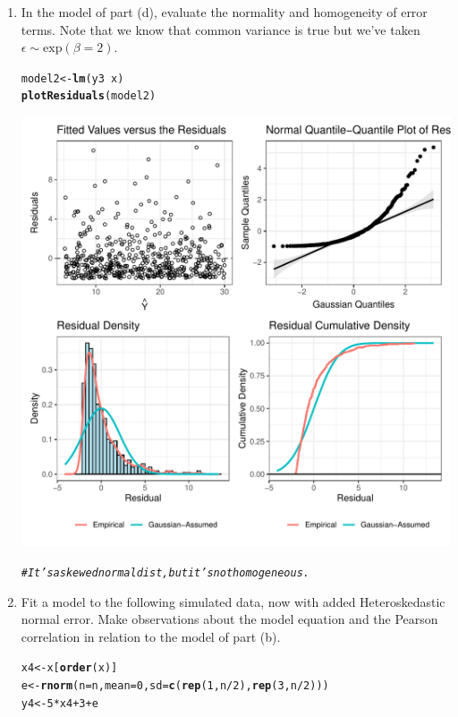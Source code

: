 \documentclass{article}\usepackage[]{graphicx}\usepackage[]{color}
\makeatletter
\def\maxwidth{ %
  \ifdim\Gin@nat@width>\linewidth
    \linewidth
  \else
    \Gin@nat@width
  \fi
}
\newcommand{\hlnum}[1]{\textcolor[rgb]{0.686,0.059,0.569}{#1}}%
\newcommand{\hlcom}[1]{\textcolor[rgb]{0.678,0.584,0.686}{\textit{#1}}}%
\newcommand{\hlopt}[1]{\textcolor[rgb]{0,0,0}{#1}}%
\newcommand{\hlstd}[1]{\textcolor[rgb]{0.345,0.345,0.345}{#1}}%
\newcommand{\hlkwb}[1]{\textcolor[rgb]{0.69,0.353,0.396}{#1}}%
\newcommand{\hlkwc}[1]{\textcolor[rgb]{0.333,0.667,0.333}{#1}}%
\newcommand{\hlkwd}[1]{\textcolor[rgb]{0.737,0.353,0.396}{\textbf{#1}}}%
\newenvironment{kframe}{%
 \def\at@end@of@kframe{}%
 \ifinner\ifhmode%
  \def\at@end@of@kframe{\end{minipage}}%
  \begin{minipage}{\columnwidth}%
 \fi\fi%
 \def\FrameCommand##1{\hskip\@totalleftmargin \hskip-\fboxsep
 \colorbox{shadecolor}{##1}\hskip-\fboxsep
     \hskip-\linewidth \hskip-\@totalleftmargin \hskip\columnwidth}%
 \MakeFramed {\advance\hsize-\width
   \@totalleftmargin\z@ \linewidth\hsize
   \@setminipage}}%
 {\par\unskip\endMakeFramed%
 \at@end@of@kframe}
\newenvironment{knitrout}{}{} %
\makeatother
\begin{document}
\begin{enumerate}
\begin{enumerate}
  \item In the model of part (d), evaluate the normality and homogeneity of error 
  terms. Note that we know that common variance is true but we've taken $\epsilon \sim 
  \textrm{exp}(\beta=2)$.
\begin{knitrout}
\color{fgcolor}\begin{kframe}
\begin{alltt}
\hlstd{model2} \hlkwb{<-} \hlkwd{lm}\hlstd{(y3}\hlopt{~}\hlstd{x)}
\hlkwd{plotResiduals}\hlstd{(model2)}
\end{alltt}
\end{kframe}
\includegraphics[width=\maxwidth]{figure/unnamed-chunk-17-1} 
\begin{kframe}\begin{alltt}
\hlcom{#It's a skewed normal dist, but it's not homogeneous.}
\end{alltt}
\end{kframe}
\end{knitrout}
\item Fit a model to the following simulated data, now with added Heteroskedastic
normal error. Make observations about the model equation and the Pearson correlation
in relation to the model of part (b).
\begin{knitrout}
\color{fgcolor}\begin{kframe}
\begin{alltt}
\hlstd{x4}\hlkwb{<-}\hlstd{x[}\hlkwd{order}\hlstd{(x)]}
\hlstd{e}\hlkwb{<-}\hlkwd{rnorm}\hlstd{(}\hlkwc{n}\hlstd{=n,}\hlkwc{mean}\hlstd{=}\hlnum{0}\hlstd{,}\hlkwc{sd}\hlstd{=}\hlkwd{c}\hlstd{(}\hlkwd{rep}\hlstd{(}\hlnum{1}\hlstd{,n}\hlopt{/}\hlnum{2}\hlstd{),}\hlkwd{rep}\hlstd{(}\hlnum{3}\hlstd{,n}\hlopt{/}\hlnum{2}\hlstd{)))}
\hlstd{y4}\hlkwb{<-}\hlnum{5}\hlopt{*}\hlstd{x4} \hlopt{+} \hlnum{3} \hlopt{+} \hlstd{e}


\end{alltt}
\end{kframe}
\end{knitrout}
\end{enumerate}
\end{enumerate}
\end{document}

